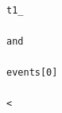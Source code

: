\documentclass[10pt,a4paper]{article} %
\begin{document}
\begin{lstlisting}
                                                                                                                                                                                                                                                                                                                                                                                                                                                                                                                                                                                                                                                                                                                                                                                                                                                                t1_
                                                                                                                                                                                                                                                                                                                                                                                                                                                                                                                                                                                                                                                                                                                                                                                                                                                                and
                                                                                                                                                                                                                                                                                                                                                                                                                                                                                                                                                                                                                                                                                                                                                                                                                                                                events[0]
                                                                                                                                                                                                                                                                                                                                                                                                                                                                                                                                                                                                                                                                                                                                                                                                                                                                <

\end{lstlisting}
\end{document}
